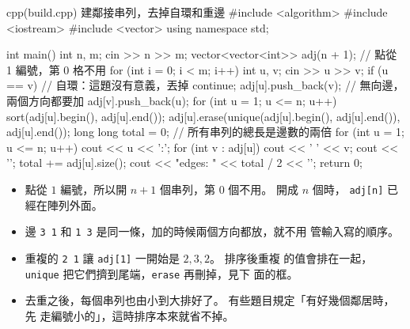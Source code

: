 \begin{example}[label=ex:build]{cpp}{(build.cpp) 建鄰接串列，去掉自環和重邊}
#include <algorithm>
#include <iostream>
#include <vector>
using namespace std;

int main() {
    int n, m;
    cin >> n >> m;
    vector<vector<int>> adj(n + 1);          // 點從 1 編號，第 0 格不用
    for (int i = 0; i < m; i++) {
        int u, v;
        cin >> u >> v;
        if (u == v) {                        // 自環：這題沒有意義，丟掉
            continue;
        }
        adj[u].push_back(v);                 // 無向邊，兩個方向都要加
        adj[v].push_back(u);
    }
    for (int u = 1; u <= n; u++) {
        sort(adj[u].begin(), adj[u].end());
        adj[u].erase(unique(adj[u].begin(), adj[u].end()), adj[u].end());
    }
    long long total = 0;                     // 所有串列的總長是邊數的兩倍
    for (int u = 1; u <= n; u++) {
        cout << u << ':';
        for (int v : adj[u]) {
            cout << ' ' << v;
        }
        cout << '\n';
        total += adj[u].size();
    }
    cout << "edges: " << total / 2 << '\n';
    return 0;
}
\end{example}


\begin{itemize}
\item 點從 $1$ 編號，所以開 $n + 1$ 個串列，第 $0$ 個不用。 開成 $n$ 個時，
\texttt{adj[n]} 已經在陣列外面。
\item 邊 \texttt{3 1} 和 \texttt{1 3} 是同一條，加的時候兩個方向都放，就不用
管輸入寫的順序。
\item 重複的 \texttt{2 1} 讓 \texttt{adj[1]} 一開始是 $2, 3, 2$。 排序後重複
的值會排在一起，\texttt{unique} 把它們擠到尾端，\texttt{erase} 再刪掉，見下
面的框。
\item 去重之後，每個串列也由小到大排好了。 有些題目規定「有好幾個鄰居時，先
走編號小的」，這時排序本來就省不掉。
\end{itemize}

